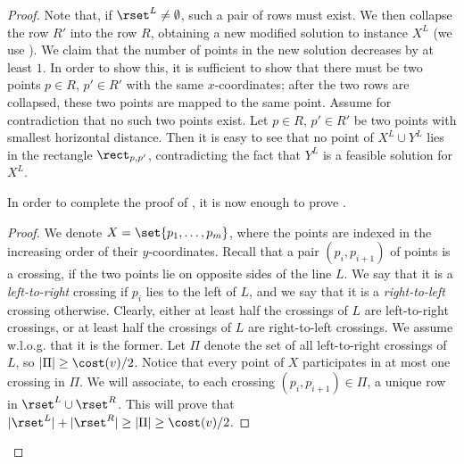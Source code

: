 \begin{proof}{}
Note that, if $\rset^L\neq\emptyset$, such a pair of rows must exist. We then collapse the row $R'$ into the row $R$, obtaining a new modified solution to instance $X^L$ (we use ). We claim that the number of points in the new solution decreases by at least $1$. In order to show this, it is sufficient to show that there must be two points $p\in R$, $p'\in R'$ with the same $x$-coordinates; after the two rows are collapsed, these two points are mapped to the same point. Assume for contradiction that no such two points exist. Let $p\in R$, $p'\in R'$ be two points with smallest horizontal distance. Then it is easy to see that no point of $X^L\cup Y^L$ lies in the rectangle $\rect_{p,p'}$, contradicting the fact that $Y^L$ is a feasible solution for $X^L$.

In order to complete the proof of , it is now enough to prove .

\begin{proof}{}
We denote $X=\set{p_1,\ldots,p_m}$, where the points are indexed in the increasing order of their $y$-coordinates. Recall that a pair $(p_i,p_{i+1})$ of points is a crossing, if the two points lie on opposite sides of the line $L$. We say that it is a \emph{left-to-right} crossing if $p_i$ lies to the left of $L$, and we say that it is a \emph{right-to-left} crossing otherwise. Clearly, either at least half the crossings of $L$ are left-to-right crossings, or at least half the crossings of $L$ are right-to-left crossings. We assume w.l.o.g. that it is the former. Let $\Pi$ denote the set of all left-to-right crossings of $L$, so $|\Pi|\geq \cost(v)/2$. Notice that every point of $X$ participates in at most one crossing in $\Pi$. We will associate, to each crossing $(p_i,p_{i+1})\in \Pi$, a unique row in $\rset^L\cup \rset^R$. This will prove that $|\rset^L|+|\rset^R|\geq |\Pi|\geq \cost(v)/2$.


\end{proof}
\end{proof}
